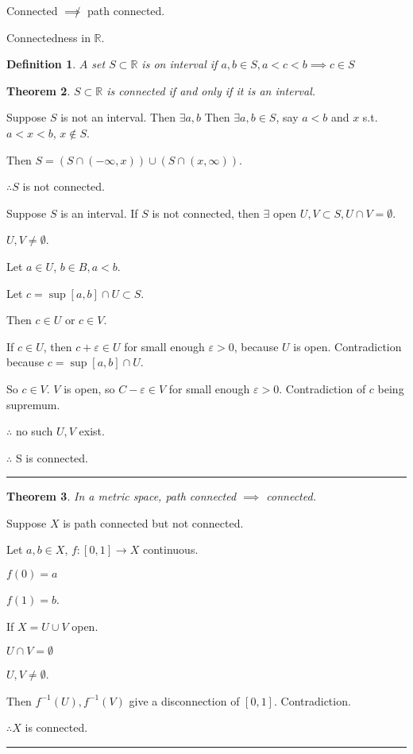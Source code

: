 \documentclass[twoside]{article}
\newcounter{lecnum}
\newcommand{\ep}{\varepsilon}
\newtheorem{theorem}{Theorem}[lecnum]
\newtheorem{definition}[theorem]{Definition}
\newenvironment{proof}{{\bf Proof:}}{\hfill\rule{2mm}{2mm}}
\newcommand\R{\mathbb{R}}
\begin{document}
Connected $\not\implies$ path connected. 

Connectedness in $\R$. 
\begin{definition}
    $A$ set $S \subset \R$ is on interval if $a,b \in S,  a < c < b \implies c \in S$
\end{definition}

\begin{theorem}
    $S \subset \R$ is connected if and only if it is an interval.
\end{theorem}

\begin{proof}
    Suppose $S$ is not an interval. Then $\exists a, b$ Then $\exists a, b \in S$, say $a < b$ and $x$ s.t. $a < x < b$, $x \not \in S$. 

    Then $S = (S \cap (-\infty, x)) \cup (S \cap (x, \infty))$. 

    $\therefore S$ is not connected. 

    Suppose $S$ is an interval. If $S$ is not connected, then $\exists$ open $U,V \subset S, U\cap V = \emptyset$.

    $U,V \neq \emptyset$. 

    Let $a \in U$, $b \in B, a < b$. 

    Let $c = \sup[a,b]\cap U \subset S$.
    
    Then $c \in U$ or $c \in V$. 

    If $c \in U$, then $c + \ep \in U$ for small enough $\ep > 0$, because $U$ is open. Contradiction because $c = \sup[a,b] \cap U$.

    So $c \in V$. $V$ is open, so $C - \ep \in V$ for small enough $\ep > 0$. Contradiction of $c$ being supremum. 

    $\therefore$ no such $U,V$ exist. 
    
    $\therefore$ S is connected. 
\end{proof}


\begin{theorem}
    In a metric space, path connected $\implies$ connected. 
\end{theorem}

\begin{proof}
    Suppose $X$ is path connected but not connected. 

    Let $a, b \in X$, $f:[0,1] \rightarrow X$ continuous. 

    $f(0) = a$

    $f(1) = b$.

    If $X = U \cup V$ open. 

    $U \cap V = \emptyset$

    $U,V \neq \emptyset$.

    Then $f^{-1}(U), f^{-1}(V)$ give a disconnection of $[0,1]$. Contradiction. 
    
    $\therefore X$ is connected. 
\end{proof}
\end{document}
